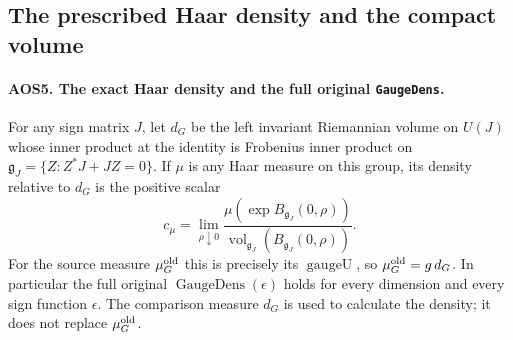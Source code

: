 \subsection{The prescribed Haar density and the compact volume}

\paragraph{AOS5. The exact Haar density and the full original \texttt{GaugeDens}.}
\label{claim:AOS5}
For any sign matrix $J$, let $d_G$ be the left invariant Riemannian
volume on $U(J)$ whose inner product at the identity is Frobenius
inner product on
$\mathfrak g_J=\{Z:Z^*J+JZ=0\}$.  If $\mu$ is any Haar measure
on this group, its density relative to $d_G$ is the positive scalar
\[
       c_\mu=\lim_{\rho\downarrow0}
          \frac{\mu(\exp B_{\mathfrak g_J}(0,\rho))}
               {\operatorname{vol}_{\mathfrak g_J}
                    (B_{\mathfrak g_J}(0,\rho))}.
 \tag{AOS.17}
\]
For the source measure $\mu_G^{\rm old}$ this is precisely its
$\operatorname{gaugeU}$, so $\mu_G^{\rm old}=g\,d_G$.
In particular the full original $\operatorname{GaugeDens}(\epsilon)$
holds for every dimension and every sign function $\epsilon$.
The comparison measure $d_G$ is used
to calculate the density; it does not replace $\mu_G^{\rm old}$.

